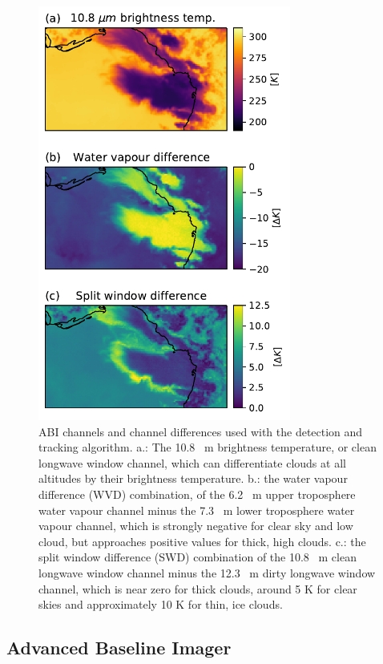 \documentclass[amt, manuscript]{copernicus}
\begin{document}
\begin{figure}[t]
    \includegraphics[width=8.3cm]{figure03.pdf}
    \caption{ABI channels and channel differences used with the detection and tracking algorithm. a.: The 10.8 \unit{\mu m} brightness temperature, or clean longwave window channel, which can differentiate clouds at all altitudes by their brightness temperature. b.: the water vapour difference (WVD) combination, of the 6.2 \unit{\mu m} upper troposphere water vapour channel minus the 7.3 \unit{\mu m} lower troposphere water vapour channel, which is strongly negative for clear sky and low cloud, but approaches positive values for thick, high clouds. c.: the split window difference (SWD) combination of the 10.8 \unit{\mu m} clean longwave window channel minus the 12.3 \unit{\mu m} dirty longwave window channel, which is near zero for thick clouds, around 5 \unit{K} for clear skies and approximately 10 \unit{K} for thin, ice clouds.}
    \label{fig:abi_channels}
\end{figure}

\subsection{Advanced Baseline Imager}
\end{document}

